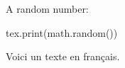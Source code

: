 \documentclass[a4paper,10pt]{article}
\begin{document}
A random number:
\begin{luacode}
tex.print(math.random())
\end{luacode}

\begin{french}
    Voici un texte en français.
\end{french}
\end{document}
